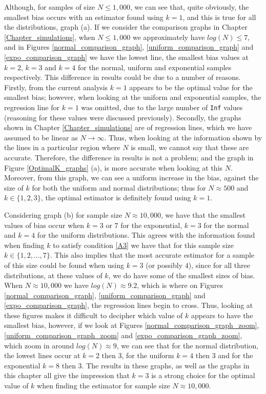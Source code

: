 \documentclass[12pt]{report}
\begin{document}
Although, for samples of size $N \leq 1,000$, we can see that, quite obviously, the smallest bias occurs with an estimator found using $k=1$, and this is true for all the distributions, graph (a). If we consider the comparison graphs in Chapter \ref{Chapter_simulations}, when $N \leq 1,000$ we approximately have $log(N) \leq 7$, and in Figures \ref{normal_comparison_graph}, \ref{uniform_comparison_graph} and \ref{expo_comparison_graph} we have the lowest line, the smallest bias values at $k=2$, $k=3$ and $k=4$ for the normal, uniform and exponential samples respectively. This difference in results could be due to a number of reasons. Firstly, from the current analysis $k=1$ appears to be the optimal value for the smallest bias; however, when looking at the uniform and exponential samples, the regression line for $k=1$ was omitted, due to the large number of \texttt{Inf} values (reasoning for these values were discussed previously). Secondly, the graphs shown in Chapter \ref{Chapter_simulations} are of regression lines, which we have assumed to be linear as $N \to \infty$. Thus, when looking at the information shown by the lines in a particular region where $N$ is small, we cannot say that these are accurate. Therefore, the difference in results is not a problem; and the graph in Figure \ref{OptimalK_graphs} (a), is more accurate when looking at this $N$. Moreover, from this graph, we can see a uniform increase in the bias, against the size of $k$ for both the uniform and normal distributions; thus for $N \approx 500$ and $k \in \{1,2, 3\}$, the optimal estimator is definitely found using $k=1$. 


Considering graph (b) for sample size $N \approx 10,000$, we have that the smallest values of bias occur when $k=3$ or $7$ for the exponential, $k=3$ for the normal and $k=4$ for the uniform distributions. This agrees with the information found when finding $k$ to satisfy condition \ref{A3} we have that for this sample size $k \in \{1, 2, ... , 7\}$. This also implies that the most accurate estimator for a sample of this size could be found when using $k =3$ (or possibly $4$), since for all three distributions, at these values of $k$, we do have some of the smallest sizes of bias. When $N \approx 10,000$ we have $log(N) \approx 9.2$, which is where on Figures  \ref{normal_comparison_graph}, \ref{uniform_comparison_graph} and \ref{expo_comparison_graph}, the regression lines begin to cross. Thus, looking at these figures makes it difficult to decipher which value of $k$ appears to have the smallest bias, however, if we look at  Figures \ref{normal_comparison_graph_zoom}, \ref{uniform_comparison_graph_zoom} and \ref{expo_comparison_graph_zoom}, which zoom in around $log(N) \approx 9$, we can see that for the normal distribution, the lowest lines occur at $k=2$ then $3$, for the uniform $k=4$ then $3$ and for the exponential $k=8$ then $3$. The results in these graphs, as well as the graphs in this chapter all give the impression that $k=3$ is a strong choice for the optimal value of $k$ when finding the estimator for sample size $N \approx 10,000$.
\end{document}
